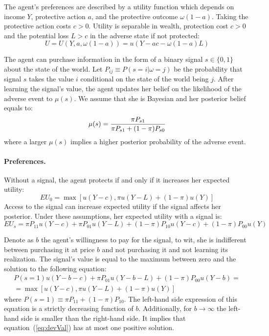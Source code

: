 \documentclass[12pt,a4paper]{article}
\begin{document}
The agent's preferences are described by a utility function which depends on income $Y$, protective action $a$, and the protective outcome $\omega(1-a)$. Taking the protective action costs $c>0$. Utility is separable in wealth, protection cost $c>0$ and the potential loss $L>c$ in the adverse state if not protected:
\[
U=U(Y,a,\omega(1-a))=u(Y-ac-\omega(1-a)L)
\]

The agent can purchase information in the form of a binary signal $s\in\{0,1\}$ about the state of the world. Let $P_{ij}\equiv P(s=i|\omega=j)$ be the probability that signal $s$ takes the value $i$ conditional on the state of the world being $j$.  After learning the signal's value, the agent updates her belief on the likelihood of the adverse event to $\mu(s)$. We assume that she is Bayesian and her posterior belief equals to:
\[
\mu(s)= {\pi P_{s1} \over \pi P_{s1}+(1-\pi)P_{s0}}
\]
where a larger $\mu(s)$ implies a higher posterior probability of the adverse event.

\vspace{10pt}
\paragraph{Preferences.} Without a signal, the agent protects if and only if it increases her expected utility:
\[
EU_0=\max[u(Y-c),\pi u(Y-L)+(1-\pi) u(Y)]
\]
Access to the signal can increase expected utility if the signal affects her posterior. Under these assumptions, her expected utility with a signal is:
\[
EU_s=\pi P_{11}u(Y-c)+\pi P_{01}u(Y-L)+(1-\pi)P_{10}u(Y-c)+(1-\pi)P_{00}u(Y)
\]

Denote as $b$ the agent's willingness to pay for the signal, to wit, she is indifferent between purchasing it at price $b$ and not purchasing it and not learning its realization. The signal's value is equal to the maximum between zero and the solution to the following equation:
\begin{equation}\label{eq:devVal}
\begin{split}
P(s=1)u(Y-b-c)+\pi P_{01}u(Y-b-L)+(1-\pi)P_{00}u(Y-b)=\\=\max[u(Y-c),\pi u(Y-L)+(1-\pi) u(Y)] 
\end{split}
\end{equation}
where $P(s=1)\equiv \pi P_{11}+(1-\pi)P_{10}$. The left-hand side expression of this equation is a strictly decreasing function of $b$. Additionally, for $b\rightarrow \infty$ the left-hand side is smaller than the right-hand side. It implies that equation~(\ref{eq:devVal}) has at most one positive solution.
\end{document}
